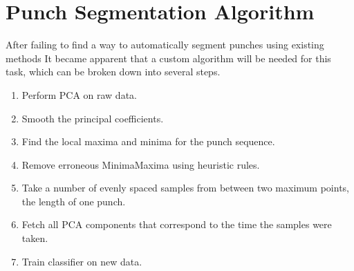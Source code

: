 \section{Punch Segmentation Algorithm}
After failing to find a way to automatically segment punches using existing methods It became apparent that a custom algorithm will be needed for this task, which can be broken down into several steps.

\begin{enumerate}[noitemsep]
  \item Perform PCA on raw data.
  \item Smooth the principal coefficients.
  \item Find the local maxima and minima for the punch sequence.
  \item Remove erroneous Minima\/Maxima using heuristic rules.
  \item Take a number of evenly spaced samples from between two maximum points, the length of one punch.
  \item Fetch all PCA components that correspond to the time the samples were taken.
  \item Train classifier on new data.
\end{enumerate}

